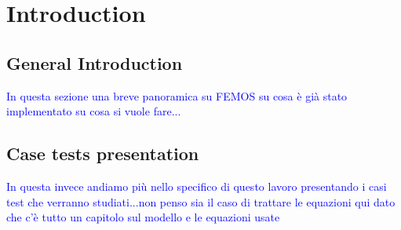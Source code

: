\chapter{Introduction}
\section{General Introduction}
\textcolor{blue}{In questa sezione una breve panoramica su FEMOS su cosa \`e gi\`a stato implementato su cosa si vuole fare...}
\section{Case tests presentation}
\textcolor{blue}{In questa invece andiamo pi\`u nello specifico di questo lavoro presentando i casi test che verranno studiati...non penso sia il caso di trattare le equazioni qui dato che c'\`e tutto un capitolo sul modello e le equazioni usate}

\begin{figure}[!h]
\end{figure}